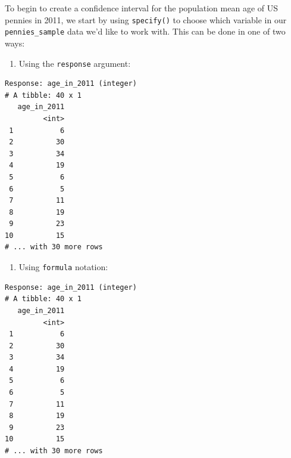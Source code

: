\documentclass[12pt,]{krantz}
\makeatletter
\newenvironment{Shaded}{\begin{snugshade}}{\end{snugshade}}
\newcommand{\KeywordTok}[1]{\textcolor[rgb]{0.27,0.27,0.27}{\textbf{#1}}}
\newcommand{\DataTypeTok}[1]{\textcolor[rgb]{0.27,0.27,0.27}{#1}}
\newcommand{\DecValTok}[1]{\textcolor[rgb]{0.06,0.06,0.06}{#1}}
\newcommand{\StringTok}[1]{\textcolor[rgb]{0.5,0.5,0.5}{#1}}
\newcommand{\OtherTok}[1]{\textcolor[rgb]{0.37,0.37,0.37}{#1}}
\newcommand{\OperatorTok}[1]{\textcolor[rgb]{0.43,0.43,0.43}{\textbf{#1}}}
\newcommand{\NormalTok}[1]{#1}
\providecommand{\tightlist}{%
  \setlength{\itemsep}{0pt}\setlength{\parskip}{0pt}}
\newenvironment{kframe}{%
\medskip{}
\setlength{\fboxsep}{.8em}
 \def\at@end@of@kframe{}%
 \ifinner\ifhmode%
  \def\at@end@of@kframe{\end{minipage}}%
  \begin{minipage}{\columnwidth}%
 \fi\fi%
 \def\FrameCommand##1{\hskip\@totalleftmargin \hskip-\fboxsep
 \colorbox{shadecolor}{##1}\hskip-\fboxsep
     \hskip-\linewidth \hskip-\@totalleftmargin \hskip\columnwidth}%
 \MakeFramed {\advance\hsize-\width
   \@totalleftmargin\z@ \linewidth\hsize
   \@setminipage}}%
 {\par\unskip\endMakeFramed%
 \at@end@of@kframe}
\renewenvironment{Shaded}{\begin{kframe}}{\end{kframe}}
\theoremstyle{definition}
\theoremstyle{definition}
\theoremstyle{definition}
\theoremstyle{remark}
\makeatother
\begin{document}
To begin to create a confidence interval for the population mean age of
US pennies in 2011, we start by using \texttt{specify()} to choose which
variable in our \texttt{pennies\_sample} data we'd like to work with.
This can be done in one of two ways:

\begin{enumerate}
\def\labelenumi{\arabic{enumi}.}
\tightlist
\item
  Using the \texttt{response} argument:
\end{enumerate}

\begin{Shaded}
\end{Shaded}

\begin{verbatim}
Response: age_in_2011 (integer)
# A tibble: 40 x 1
   age_in_2011
         <int>
 1           6
 2          30
 3          34
 4          19
 5           6
 6           5
 7          11
 8          19
 9          23
10          15
# ... with 30 more rows
\end{verbatim}

\begin{enumerate}
\def\labelenumi{\arabic{enumi}.}
\setcounter{enumi}{1}
\tightlist
\item
  Using \texttt{formula} notation:
\end{enumerate}

\begin{Shaded}
\end{Shaded}

\begin{verbatim}
Response: age_in_2011 (integer)
# A tibble: 40 x 1
   age_in_2011
         <int>
 1           6
 2          30
 3          34
 4          19
 5           6
 6           5
 7          11
 8          19
 9          23
10          15
# ... with 30 more rows
\end{verbatim}
\end{document}
